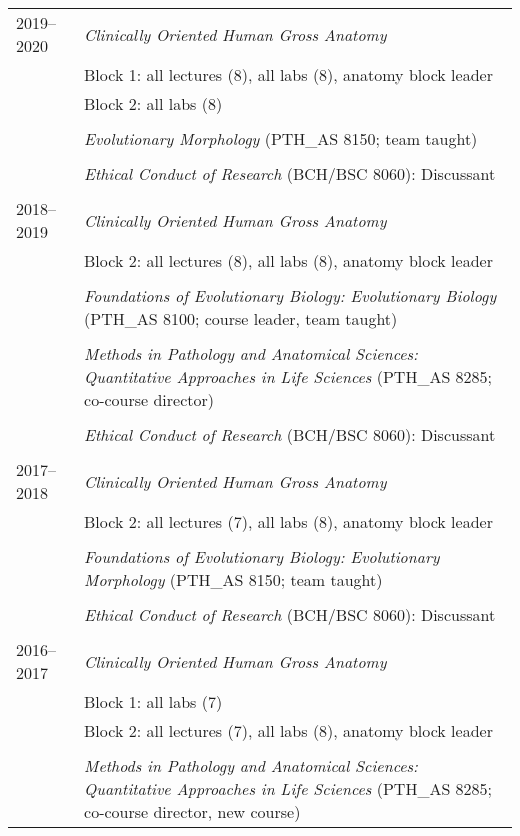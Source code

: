 \begin{longtable}{@{}lX@{}}
  2019--2020 & \textit{Clinically Oriented Human Gross Anatomy}\\
    & Block 1: all lectures (8), all labs (8), anatomy block leader\\
    & Block 2: all labs (8)\\
    \\
    & \textit{Evolutionary Morphology} (PTH\_AS 8150; team taught)\\
    \\
    & \textit{Ethical Conduct of Research} (BCH/BSC 8060): Discussant\\
    \\
  2018--2019 & \textit{Clinically Oriented Human Gross Anatomy}\\
    & Block 2: all lectures (8), all labs (8), anatomy block leader\\
    \\
    & \textit{Foundations of Evolutionary Biology: Evolutionary Biology} (PTH\_AS 8100; course leader, team taught)\\
    \\
    & \textit{Methods in Pathology and Anatomical Sciences: Quantitative Approaches in Life Sciences} (PTH\_AS 8285; co-course director)\\
    \\
    & \textit{Ethical Conduct of Research} (BCH/BSC 8060): Discussant\\
    \\
  2017--2018 & \textit{Clinically Oriented Human Gross Anatomy}\\
    & Block 2: all lectures (7), all labs (8), anatomy block leader\\
    \\
    & \textit{Foundations of Evolutionary Biology: Evolutionary Morphology} (PTH\_AS 8150; team taught)\\
    \\
    & \textit{Ethical Conduct of Research} (BCH/BSC 8060): Discussant\\
    \\
    2016--2017 & \textit{Clinically Oriented Human Gross Anatomy}\\
    & Block 1: all labs (7)\\
    & Block 2: all lectures (7), all labs (8), anatomy block leader\\
    \\
    & \textit{Methods in Pathology and Anatomical Sciences: Quantitative Approaches in Life Sciences} (PTH\_AS 8285; co-course director, new course)\\

\end{longtable}
